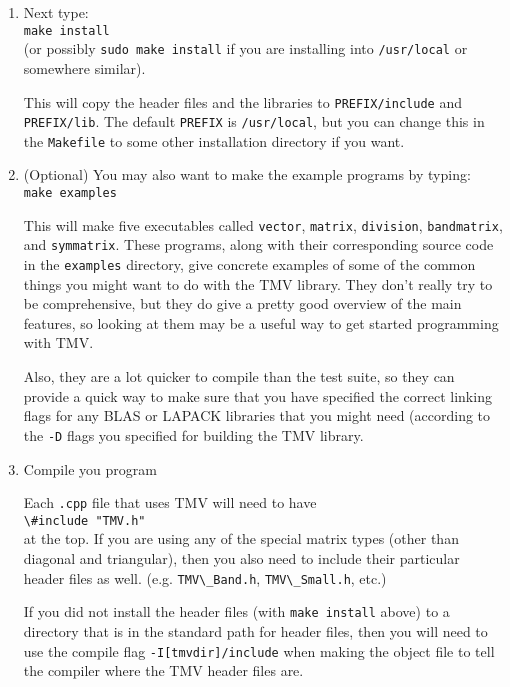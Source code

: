 \documentclass[twoside,letterpaper,11pt]{article}
\renewcommand{\tt}[1]{{\lstinline {#1}}}
\begin{document}
\begin{enumerate}
\item
Next type:\\
\texttt{make install}\\
(or possibly \tt{sudo make install} if you are installing into \tt{/usr/local} or somewhere similar).

This will copy the header files and the libraries to \texttt{PREFIX/include} and 
\texttt{PREFIX/lib}.  The default \texttt{PREFIX} is \texttt{/usr/local}, but you can change
this in the \texttt{Makefile} to some other installation directory if you want.

\item
(Optional) You may also want to make the example programs by typing:\\
\texttt{make examples}

This will make five executables called \texttt{vector}, \texttt{matrix}, \texttt{division},
\texttt{bandmatrix}, and \texttt{symmatrix}.
These programs, along with their corresponding source code in the \texttt{examples}
directory, give concrete examples of some of the common things you might want
to do with the TMV library.  They don't really try to be comprehensive,
but they do give a pretty good overview of the main features,
so looking at them may be a useful way to get started programming with TMV.

Also, they are a lot quicker to compile than the test suite, so they can provide a 
quick way to make sure that you have specified the correct linking flags for any
BLAS or LAPACK libraries that you might need (according to the \tt{-D} flags
you specified for building the TMV library.

\item
Compile you program

Each \texttt{.cpp} file that uses TMV will need to have \\
\tt{\#include "TMV.h"}\\
at the top.
If you are using any of the special matrix types (other than diagonal and triangular),
then you also need to include their particular header files as well. (e.g.
\tt{TMV\_Band.h}, \tt{TMV\_Small.h}, etc.)

If you did not install the header files (with \texttt{make install} above) to 
a directory that is in the standard path for header files, then 
you will need to use the compile flag
\texttt{-I[tmvdir]/include} when making the object file to tell the 
compiler where the TMV header files are.


\end{enumerate}
\end{document}
